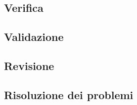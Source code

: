 \documentclass[../norme-di-progetto.tex]{subfiles}
\begin{document}
\subsection{Verifica}%
\label{sub:verifica}



\subsection{Validazione}%
\label{sub:validazione}



\subsection{Revisione}%
\label{sub:revisione}



\subsection{Risoluzione dei problemi}%
\label{sub:risoluzione_dei_problemi}


\end{document}
